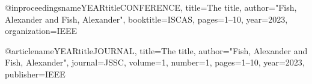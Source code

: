 
@inproceedings{nameYEARtitleCONFERENCE,
  title={The title},
  author="Fish, Alexander and Fish, Alexander",
  booktitle=ISCAS,
  pages={1--10},
  year={2023},
  organization={IEEE}
}

@article{nameYEARtitleJOURNAL,
  title={The title},
  author="Fish, Alexander and Fish, Alexander",
  journal=JSSC,
  volume={1},
  number={1},
  pages={1--10},
  year={2023},
  publisher={IEEE}
}
